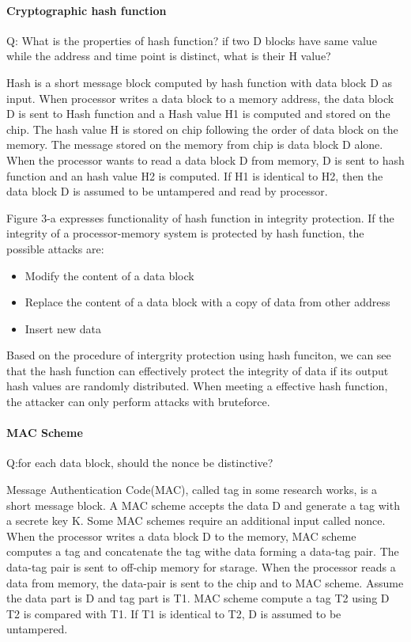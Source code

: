 \documentclass{article}
\begin{document}
\paragraph{Cryptographic hash function}
Q: What is the properties of hash function? if two D blocks have same value while the address and time point is distinct, what is their H value?

Hash is a short message block computed by hash function with data block D as input.
When processor writes a data block to a memory address, the data block D is sent to Hash function and a Hash value H1 is computed and stored on the chip. The hash value H is stored on chip following the order of data block on the memory. The message stored on the memory from chip is data block D alone.
When the processor wants to read a data block D from memory, D is sent to hash function and an hash value H2 is computed. If H1 is identical to H2, then the data block D is assumed to be untampered and read by processor.

Figure 3-a expresses functionality of hash function in integrity protection.
If the integrity of a processor-memory system is protected by hash function, the possible attacks are:
\begin{itemize}
	\item Modify the content of a data block
	\item Replace the content of a data block with a copy of data from other address
	\item Insert new data
\end{itemize}
Based on the procedure of intergrity protection using hash funciton, we can see that the hash function can effectively protect the integrity of data if its output hash values are randomly distributed. When meeting a effective hash function, the attacker can only perform attacks with bruteforce.
  
\paragraph{MAC Scheme}
Q:for each data block, should the nonce be distinctive?

Message Authentication Code(MAC), called tag in some research works, is a short message block. A MAC scheme accepts the data D and generate a tag with a secrete key K. Some MAC schemes require an additional input called nonce.
When the processor writes a data block D to the memory, MAC scheme computes a tag  and concatenate the tag withe data forming a data-tag pair. The data-tag pair is sent to off-chip memory for starage.
When the processor reads a data from memory, the data-pair is sent to the chip and to MAC scheme. Assume the data part is D and tag part is T1. MAC scheme compute a tag T2 using D T2 is compared with T1. If T1 is identical to T2, D is assumed to be untampered.
 
\end{document}
